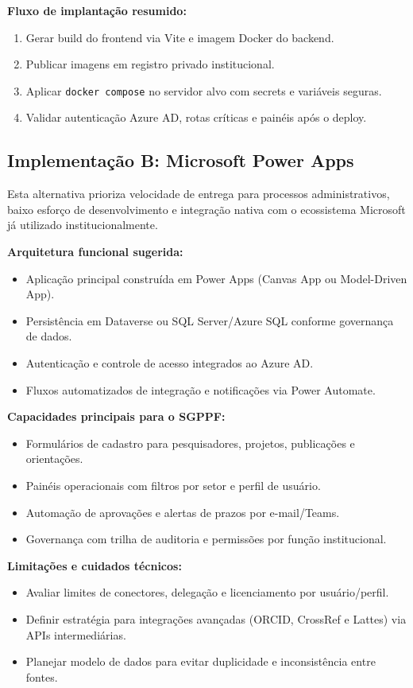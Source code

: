 \documentclass[12pt,a4paper]{article}
\begin{document}
\textbf{Fluxo de implantação resumido:}
\begin{enumerate}[leftmargin=*]
  \item Gerar build do frontend via Vite e imagem Docker do backend.
  \item Publicar imagens em registro privado institucional.
  \item Aplicar \texttt{docker compose} no servidor alvo com secrets e variáveis seguras.
  \item Validar autenticação Azure AD, rotas críticas e painéis após o deploy.
\end{enumerate}

\subsection{Implementação B: Microsoft Power Apps}
Esta alternativa prioriza velocidade de entrega para processos administrativos, baixo esforço de desenvolvimento e integração nativa com o ecossistema Microsoft já utilizado institucionalmente.

\textbf{Arquitetura funcional sugerida:}
\begin{itemize}[leftmargin=*]
  \item Aplicação principal construída em Power Apps (Canvas App ou Model-Driven App).
  \item Persistência em Dataverse ou SQL Server/Azure SQL conforme governança de dados.
  \item Autenticação e controle de acesso integrados ao Azure AD.
  \item Fluxos automatizados de integração e notificações via Power Automate.
\end{itemize}

\textbf{Capacidades principais para o SGPPF:}
\begin{itemize}[leftmargin=*]
  \item Formulários de cadastro para pesquisadores, projetos, publicações e orientações.
  \item Painéis operacionais com filtros por setor e perfil de usuário.
  \item Automação de aprovações e alertas de prazos por e-mail/Teams.
  \item Governança com trilha de auditoria e permissões por função institucional.
\end{itemize}

\textbf{Limitações e cuidados técnicos:}
\begin{itemize}[leftmargin=*]
  \item Avaliar limites de conectores, delegação e licenciamento por usuário/perfil.
  \item Definir estratégia para integrações avançadas (ORCID, CrossRef e Lattes) via APIs intermediárias.
  \item Planejar modelo de dados para evitar duplicidade e inconsistência entre fontes.
\end{itemize}
\end{document}
